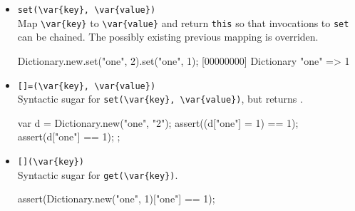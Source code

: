\begin{itemize}
\item \lstinline|set(\var{key}, \var{value})|\\
  Map \lstinline|\var{key}| to \lstinline|\var{value}| and return
  \lstinline|this| so that invocations to \lstinline|set| can be
  chained.  The possibly existing previous mapping is overriden.

\begin{urbiscript}[firstnumber=last]
Dictionary.new.set("one", 2).set("one", 1);
[00000000] Dictionary {"one" => 1}
\end{urbiscript}

\item \lstinline|[]=(\var{key}, \var{value})|\\
  Syntactic sugar for \lstinline|set(\var{key}, \var{value})|, but
  returns .

\begin{urbiscript}[firstnumber=last]
{
  var d = Dictionary.new("one", "2");
  assert((d["one"] = 1) == 1);
  assert(d["one"] == 1);
};
\end{urbiscript}

\item \lstinline|[](\var{key})|\\
  Syntactic sugar for \lstinline|get(\var{key})|.

\begin{urbiscript}[firstnumber=last]
assert(Dictionary.new("one", 1)["one"] == 1);
\end{urbiscript}

\end{itemize}


